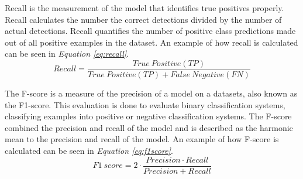 Recall is the measurement of the model that identifies true positives properly. Recall calculates the number the correct detections divided by the number of actual detections\cite{shung_accuracy_2020}. Recall quantifies the number of positive class predictions made out of all positive examples in the dataset. An example of how recall is calculated can be seen in \textit{Equation \ref{eq:recall}}.
\begin{equation}
    Recall = \frac{True\ Positive(TP)}{True\ Positive(TP)+False \ Negative(FN)}
    \label{eq:recall}
\end{equation}

The F-score is a measure of the precision of a model on a datasets, also known as the F1-score. This evaluation is done to evaluate binary classification systems, classifying examples into positive or negative classification systems. 
The F-score combined the precision and recall of the model and is described as the harmonic mean to the precision and recall of the model\cite{wood_f-score_2019}.
An example of how F-score is calculated can be seen in \textit{Equation \ref{eq:f1score}}.
\begin{equation}
    F1\ score = 2 \cdot \frac{Precision \cdot Recall}{Precision + Recall}
    \label{eq:f1score}
\end{equation}
